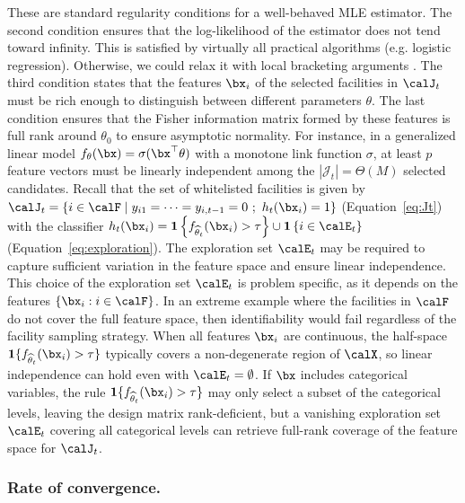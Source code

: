 \documentclass[blindrev]{informs3noheader}
\begin{document}
These are standard regularity conditions for a well-behaved MLE estimator. The second condition ensures that the log-likelihood of the estimator does not tend toward infinity. This is satisfied by virtually all practical algorithms (e.g. logistic regression). Otherwise, we could relax it with local bracketing arguments \citep{van1996weak}. The third condition states that the features $\bx_i$ of the selected facilities in $\calJ_t$ must be rich enough to distinguish between different parameters $\theta$. The last condition ensures that the Fisher information matrix formed by these features is full rank around $\theta_0$ to ensure asymptotic normality. For instance, in a generalized linear model $f_\theta(\bx)=\sigma(\bx^\top\theta)$ with a monotone link function $\sigma$, at least $p$ feature vectors must be linearly independent among the $|\mathcal{J}_t|=\Theta(M)$ selected candidates. Recall that the set of whitelisted facilities is given by $\calJ_t=\{i\in\calF\mid y_{i1}=\cdots=y_{i,t-1}=0\ ;\ h_t(\bx_{i})=1\}$ (Equation~\eqref{eq:Jt}) with the classifier $h_t(\bx_i)=\mathbf{1}\left\{f_{\widehat{\theta}_t}(\bx_{i})>\tau\right\}\cup \mathbf{1}\left\{i \in \calE_t\right\}$ (Equation~\eqref{eq:exploration}). The exploration set $\calE_t$ may be required to capture sufficient variation in the feature space and ensure linear independence. This choice of the exploration set $\calE_t$ is problem specific, as it depends on the features $\{\bx_i:i\in\calF\}$. In an extreme example where the facilities in $\calF$ do not cover the full feature space, then identifiability would fail regardless of the facility sampling strategy. When all features $\bx_i$ are continuous, the half-space $\mathbf{1}\{f_{\widehat\theta_t}(\bx_i)>\tau\}$ typically covers a non-degenerate region of $\calX$, so linear independence can hold even with $\calE_t=\emptyset$. If $\bx$ includes categorical variables, the rule $\mathbf{1}\{f_{\widehat\theta_t}(\bx_i)>\tau\}$ may only select a subset of the categorical levels, leaving the design matrix rank-deficient, but a vanishing exploration set $\calE_t$ covering all categorical levels can retrieve full-rank coverage of the feature space for $\calJ_t$.

\subsubsection*{Rate of convergence.}
\end{document}
